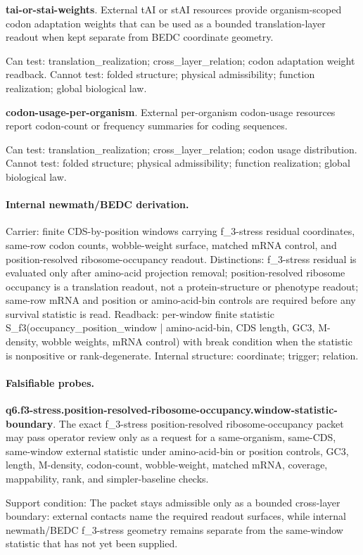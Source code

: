 \textbf{tai-or-stai-weights}. External tAI or stAI resources provide organism-scoped codon adaptation weights that can be used as a bounded translation-layer readout when kept separate from BEDC coordinate geometry.

Can test: translation\_realization; cross\_layer\_relation; codon adaptation weight readback. Cannot test: folded structure; physical admissibility; function realization; global biological law.

\textbf{codon-usage-per-organism}. External per-organism codon-usage resources report codon-count or frequency summaries for coding sequences.

Can test: translation\_realization; cross\_layer\_relation; codon usage distribution. Cannot test: folded structure; physical admissibility; function realization; global biological law.

\paragraph{Internal newmath/BEDC derivation.} Carrier: finite CDS-by-position windows carrying f\_3-stress residual coordinates, same-row codon counts, wobble-weight surface, matched mRNA control, and position-resolved ribosome-occupancy readout. Distinctions: f\_3-stress residual is evaluated only after amino-acid projection removal; position-resolved ribosome occupancy is a translation readout, not a protein-structure or phenotype readout; same-row mRNA and position or amino-acid-bin controls are required before any survival statistic is read. Readback: per-window finite statistic S\_f3(occupancy\_position\_window | amino-acid-bin, CDS length, GC3, M-density, wobble weights, mRNA control) with break condition when the statistic is nonpositive or rank-degenerate. Internal structure: coordinate; trigger; relation.

\paragraph{Falsifiable probes.}
\textbf{q6.f3-stress.position-resolved-ribosome-occupancy.window-statistic-boundary}. The exact f\_3-stress position-resolved ribosome-occupancy packet may pass operator review only as a request for a same-organism, same-CDS, same-window external statistic under amino-acid-bin or position controls, GC3, length, M-density, codon-count, wobble-weight, matched mRNA, coverage, mappability, rank, and simpler-baseline checks.

Support condition: The packet stays admissible only as a bounded cross-layer boundary: external contacts name the required readout surfaces, while internal newmath/BEDC f\_3-stress geometry remains separate from the same-window statistic that has not yet been supplied.

